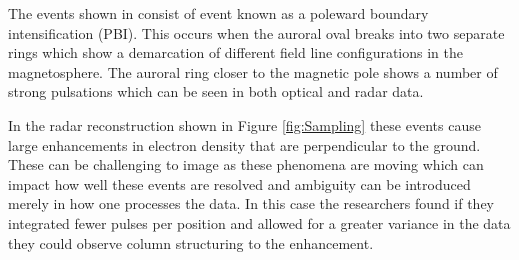 The events shown in \cite{Semeter:2005fo} consist of event known as a poleward boundary intensification (PBI). This occurs when the auroral oval breaks into two separate rings which show a demarcation of different field line configurations in the magnetosphere. The auroral ring closer to the magnetic pole shows a number of strong pulsations which can be seen in both optical and radar data.

In the radar reconstruction shown in Figure \ref{fig:Sampling} these events cause large enhancements in electron density that are perpendicular to the ground. These can be challenging to image as these phenomena are moving which can impact how well these events are resolved and ambiguity can be introduced merely in how one processes the data. In this case the researchers found if they integrated fewer pulses per position and allowed for a greater variance in the data they could observe column structuring to the enhancement.

